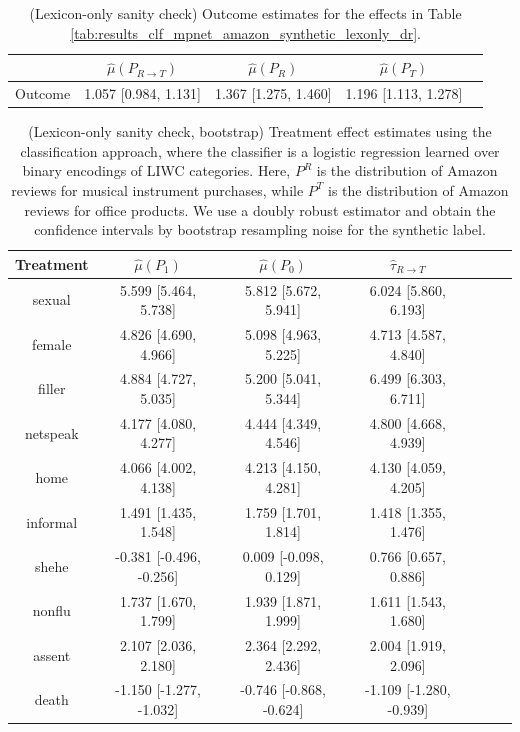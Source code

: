 \documentclass{article}
\begin{document}
\begin{table}[!ht]
\centering
\begin{tabular}{c|cccc}
\toprule
    & $\hat{\mu}(P_{R \rightarrow T})$   & $\hat{\mu}(P_R)$     & $\hat{\mu}(P_T)$     \\
\midrule
    Outcome & 1.057 [0.984, 1.131]               & 1.367 [1.275, 1.460] & 1.196 [1.113, 1.278] \\
\bottomrule
\end{tabular}
\caption{(Lexicon-only sanity check) Outcome estimates for the effects in Table \ref{tab:results_clf_mpnet_amazon_synthetic_lexonly_dr}.}
\label{tab:results_clf_mpnet_amazon_synthetic_lexonly_dr_outcome}
\end{table}

\begin{table}[!ht]
\centering
\begin{tabular}{c|cccccc}
\toprule
    Treatment   & $\hat{\mu}(P_1)$        & $\hat{\mu}(P_0)$        & $\hat{\tau}_{R \rightarrow T}$   \\
\midrule
    sexual      & 5.599 [5.464, 5.738]    & 5.812 [5.672, 5.941]    & 6.024 [5.860, 6.193]             \\
    female      & 4.826 [4.690, 4.966]    & 5.098 [4.963, 5.225]    & 4.713 [4.587, 4.840]             \\
    filler      & 4.884 [4.727, 5.035]    & 5.200 [5.041, 5.344]    & 6.499 [6.303, 6.711]             \\
    netspeak    & 4.177 [4.080, 4.277]    & 4.444 [4.349, 4.546]    & 4.800 [4.668, 4.939]             \\
    home        & 4.066 [4.002, 4.138]    & 4.213 [4.150, 4.281]    & 4.130 [4.059, 4.205]             \\
    informal    & 1.491 [1.435, 1.548]    & 1.759 [1.701, 1.814]    & 1.418 [1.355, 1.476]             \\
    shehe       & -0.381 [-0.496, -0.256] & 0.009 [-0.098, 0.129]   & 0.766 [0.657, 0.886]             \\
    nonflu      & 1.737 [1.670, 1.799]    & 1.939 [1.871, 1.999]    & 1.611 [1.543, 1.680]             \\
    assent      & 2.107 [2.036, 2.180]    & 2.364 [2.292, 2.436]    & 2.004 [1.919, 2.096]             \\
    death       & -1.150 [-1.277, -1.032] & -0.746 [-0.868, -0.624] & -1.109 [-1.280, -0.939]          \\
\bottomrule
\end{tabular}
\caption{(Lexicon-only sanity check, bootstrap) Treatment effect estimates using the classification approach, where the classifier is a logistic regression learned over binary encodings of LIWC categories. Here, $P^R$ is the distribution of Amazon reviews for musical instrument purchases, while $P^T$ is the distribution of Amazon reviews for office products. We use a doubly robust estimator and obtain the confidence intervals by bootstrap resampling noise for the synthetic label.}
\label{tab:results_clf_mpnet_amazon_synthetic_lexonly_dr_bootstrap}
\end{table}
\end{document}
